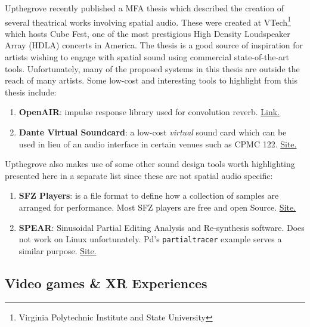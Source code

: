 Upthegrove \cite{upthegrove2019auragami} recently published a MFA thesis which described the creation of several theatrical works involving spatial audio. These were created at VTech\footnote{Virginia Polytechnic Institute and State University} which hosts Cube Fest, one of the most prestigious High Density Loudspeaker Array (HDLA) concerts in America. The thesis is a good source of inspiration for artists wishing to engage with spatial sound using commercial state-of-the-art tools. Unfortunately, many of the proposed systems in this thesis are outside the reach of many artists. Some low-cost and interesting tools to highlight from this thesis include:

\begin{enumerate}
    \item \textbf{OpenAIR}: impulse response library used for convolution reverb. \href{https://openairlib.net/}{Link.}
    \item \textbf{Dante Virtual Soundcard}: a low-cost \textit{virtual} sound card which can be used in lieu of an audio interface in certain venues such as CPMC 122. \href{https://www.audinate.com/products/software/dante-virtual-soundcard?force=true}{Site.}
\end{enumerate}

Upthegrove also makes use of some other sound design tools worth highlighting presented here in a separate list since these are not spatial audio specific: 

\begin{enumerate}
    \item \textbf{SFZ Players}: is a file format to define how a collection of samples are arranged for performance. Most SFZ players are free and open Source. \href{https://sfzformat.com/}{Site.}
    \item \textbf{SPEAR}: Sinusoidal Partial Editing Analysis and Re-synthesis software. Does not work on Linux unfortunately. Pd's \texttt{partialtracer} example serves a similar purpose. \href{http://www.klingbeil.com/spear/}{Site.}
\end{enumerate}

\subsection{Video games \& XR Experiences}


